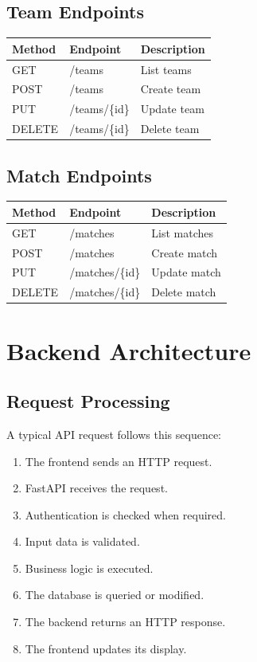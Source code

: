 \documentclass[12pt,a4paper]{article}
\begin{document}
\subsection{Team Endpoints}

\begin{longtable}{lll}
\toprule
\textbf{Method} & \textbf{Endpoint} & \textbf{Description}\\
\midrule
GET & /teams & List teams\\
POST & /teams & Create team\\
PUT & /teams/\{id\} & Update team\\
DELETE & /teams/\{id\} & Delete team\\
\bottomrule
\end{longtable}

\subsection{Match Endpoints}

\begin{longtable}{lll}
\toprule
\textbf{Method} & \textbf{Endpoint} & \textbf{Description}\\
\midrule
GET & /matches & List matches\\
POST & /matches & Create match\\
PUT & /matches/\{id\} & Update match\\
DELETE & /matches/\{id\} & Delete match\\
\bottomrule
\end{longtable}


\section{Backend Architecture}

\subsection{Request Processing}

A typical API request follows this sequence:

\begin{enumerate}
    \item The frontend sends an HTTP request.
    \item FastAPI receives the request.
    \item Authentication is checked when required.
    \item Input data is validated.
    \item Business logic is executed.
    \item The database is queried or modified.
    \item The backend returns an HTTP response.
    \item The frontend updates its display.
\end{enumerate}
\end{document}
